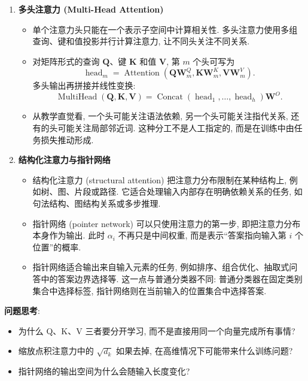 \documentclass{../nndlcourse}
\begin{document}
\begin{enumerate}
\begin{itemize}
    \end{itemize}
  \item \textbf{多头注意力 (Multi-Head Attention)}
    \begin{itemize}
      \item 单个注意力头只能在一个表示子空间中计算相关性. 多头注意力使用多组查询、键和值投影并行计算注意力, 让不同头关注不同关系.
      \item 对矩阵形式的查询 $\boldsymbol{Q}$、键 $\boldsymbol{K}$ 和值 $\boldsymbol{V}$, 第 $m$ 个头可写为
      \begin{equation*}
        \operatorname{head}_m
        =
        \operatorname{Attention}
        \left(
          \boldsymbol{Q}\boldsymbol{W}_m^Q,
          \boldsymbol{K}\boldsymbol{W}_m^K,
          \boldsymbol{V}\boldsymbol{W}_m^V
        \right).
      \end{equation*}
      多头输出再拼接并线性变换:
      \begin{equation*}
        \operatorname{MultiHead}(\boldsymbol{Q},\boldsymbol{K},\boldsymbol{V})
        =
        \operatorname{Concat}(\operatorname{head}_1,\ldots,\operatorname{head}_h)\boldsymbol{W}^O.
      \end{equation*}
      \item 从教学直觉看, 一个头可能关注语法依赖, 另一个头可能关注指代关系, 还有的头可能关注局部邻近词. 这种分工不是人工指定的, 而是在训练中由任务损失推动形成.
    \end{itemize}
  \item \textbf{结构化注意力与指针网络}
    \begin{itemize}
      \item 结构化注意力 (structural attention) 把注意力分布限制在某种结构上, 例如树、图、片段或路径. 它适合处理输入内部存在明确依赖关系的任务, 如句法结构、图结构关系或多步推理.
      \item 指针网络 (pointer network) 可以只使用注意力的第一步, 即把注意力分布本身作为输出. 此时 $\alpha_i$ 不再只是中间权重, 而是表示“答案指向输入第 $i$ 个位置”的概率.
      \item 指针网络适合输出来自输入元素的任务, 例如排序、组合优化、抽取式问答中的答案边界选择等. 这一点与普通分类器不同: 普通分类器在固定类别集合中选择标签, 指针网络则在当前输入的位置集合中选择答案.
    \end{itemize}
\end{enumerate}

\textbf{问题思考}:
\begin{itemize}
  \item 为什么 Q、K、V 三者要分开学习, 而不是直接用同一个向量完成所有事情?
  \item 缩放点积注意力中的 $\sqrt{d_k}$ 如果去掉, 在高维情况下可能带来什么训练问题?
  \item 指针网络的输出空间为什么会随输入长度变化?
\end{itemize}
\end{document}
